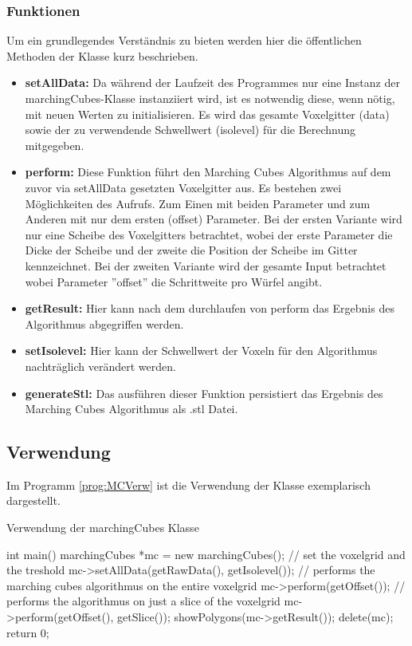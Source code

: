\subsubsection{Funktionen}
Um ein grundlegendes Verständnis zu bieten werden hier die öffentlichen Methoden der Klasse kurz beschrieben. 
\begin{itemize}
	\item \textbf{setAllData:} Da während der Laufzeit des Programmes nur eine Instanz der marchingCubes-Klasse instanziiert wird, ist es notwendig diese, wenn nötig, mit neuen Werten zu initialisieren. Es wird das gesamte Voxelgitter (data) sowie der zu verwendende Schwellwert (isolevel) für die Berechnung mitgegeben.
	\item \textbf{perform:} Diese Funktion führt den Marching Cubes Algorithmus auf dem zuvor via setAllData gesetzten Voxelgitter aus. Es bestehen zwei Möglichkeiten des Aufrufs. Zum Einen mit beiden Parameter und zum Anderen mit nur dem ersten (offset) Parameter. Bei der ersten Variante wird nur eine Scheibe des Voxelgitters betrachtet, wobei der erste Parameter die Dicke der Scheibe und der zweite die Position der Scheibe im Gitter kennzeichnet. Bei der zweiten Variante wird der gesamte Input betrachtet wobei Parameter ''offset'' die Schrittweite pro Würfel angibt. 
	\item \textbf{getResult:} Hier kann nach dem durchlaufen von perform das Ergebnis des Algorithmus abgegriffen werden. 
	\item \textbf{setIsolevel:} Hier kann der Schwellwert der Voxeln für den Algorithmus nachträglich verändert werden.
	\item \textbf{generateStl:} Das ausführen dieser Funktion persistiert das Ergebnis des Marching Cubes Algorithmus als .stl Datei.
\end{itemize}
\subsection{Verwendung}
Im Programm \ref{prog:MCVerw} ist die Verwendung der Klasse exemplarisch dargestellt.
\begin{program}[H]
	\caption{Verwendung der marchingCubes Klasse}
	\label{prog:MCVerw}
	\begin{CCode}
		int main(){
			marchingCubes *mc = new marchingCubes();
			// set the voxelgrid and the treshold
			mc->setAllData(getRawData(), getIsolevel()); 
			// performs the marching cubes algorithmus on the entire voxelgrid
			mc->perform(getOffset()); 		
			// performs the algorithmus on just a slice of the voxelgrid 
			mc->perform(getOffset(), getSlice()); 
			showPolygons(mc->getResult()); 
			delete(mc);
			return 0;	
		}
	\end{CCode}
\end{program}
